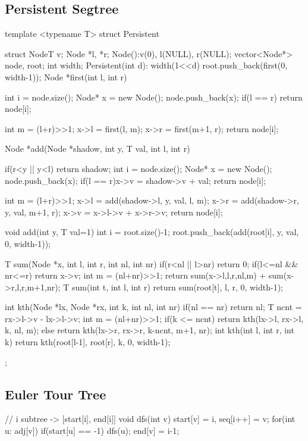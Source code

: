 \subsection{Persistent Segtree}
\begin{cpp}
template <typename T>
struct Persistent{
  struct Node{T v; Node *l, *r;
    Node():v(0), l(NULL), r(NULL){}};
  vector<Node*> node, root;
  int width;
  Persistent(int d): width(1<<d)
    {root.push_back(first(0, width-1));}
  Node *first(int l, int r){
    int i = node.size();
    Node* x = new Node(); node.push_back(x);
    if(l == r) return node[i];
    
    int m = (l+r)>>1;
    x->l = first(l, m);
    x->r = first(m+1, r);
    return node[i];
  }

  Node *add(Node *shadow, int y, T val, int l, int r){
    if(r<y || y<l) return shadow;
    int i = node.size();
    Node* x = new Node(); node.push_back(x);
    if(l == r){x->v = shadow->v + val; return node[i];}
    
    int m = (l+r)>>1;
    x->l = add(shadow->l, y, val, l, m);
    x->r = add(shadow->r, y, val, m+1, r);
    x->v = x->l->v + x->r->v;
    return node[i];
  }
  void add(int y, T val=1){
    int i = root.size()-1;
    root.push_back(add(root[i], y, val, 0, width-1));
  }
  
  T sum(Node *x, int l, int r, int nl, int nr){
    if(r<nl || l>nr) return 0;
    if(l<=nl && nr<=r) return x->v;
    int m = (nl+nr)>>1;
    return sum(x->l,l,r,nl,m) + sum(x->r,l,r,m+1,nr);
  }
  T sum(int t, int l, int r)
    {return sum(root[t], l, r, 0, width-1);}
  
  int kth(Node *lx, Node *rx, int k, int nl, int nr){
    if(nl == nr) return nl;
    T ncnt = rx->l->v - lx->l->v;
    int m = (nl+nr)>>1;
    if(k <= ncnt) return kth(lx->l, rx->l, k, nl, m);
    else return kth(lx->r, rx->r, k-ncnt, m+1, nr);
  }
  int kth(int l, int r, int k)
    {return kth(root[l-1], root[r], k, 0, width-1);}
};
\end{cpp}

\subsection{Euler Tour Tree}
\begin{cpp}
// i subtree -> [start[i], end[i]]
void dfs(int v){
    start[v] = i, seq[i++] = v;
    for(int u: adj[v]) if(start[u] == -1) dfs(u);
    end[v] = i-1;
}
\end{cpp}

